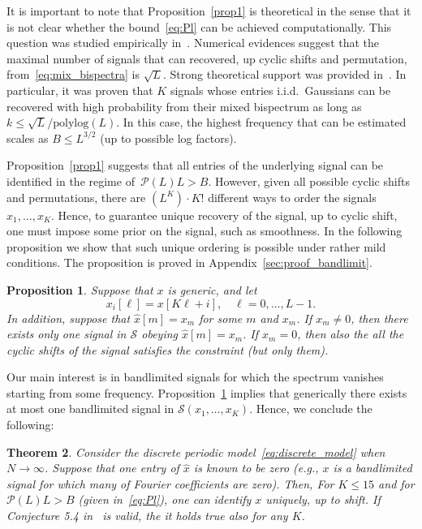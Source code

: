 \documentclass[english,12pt]{article}
\newcommand{\hx}{\hat{x}}
\newcommand{\TODO}[1]{{\color{red}{[#1]}}}
\newtheorem{thm}{Theorem}
\numberwithin{equation}{section}
\numberwithin{thm}{section} %
\newtheorem{prop}[thm]{Proposition}
\begin{document}
It is important to note that Proposition~\eqref{prop1} is theoretical in the sense that it is not clear whether the bound~\eqref{eq:Pl} can be achieved computationally.  
This question was studied empirically in~\cite{boumal2018heterogeneous}. Numerical evidences suggest that the maximal number of signals that can recovered, up cyclic shifts and permutation, from~\eqref{eq:mix_bispectra} is $\sqrt{L}$. 
Strong theoretical support was provided in~\cite{weinthesis}. In particular,  it was proven that $K$ signals whose entries i.i.d.\ Gaussians can be recovered with high probability from their mixed bispectrum as long as $k\leq \sqrt{L}/\text{polylog}(L)$.
In this case, the highest frequency that can be estimated scales as $B\leq L^{3/2}$ (up to possible log factors). 



Proposition~\ref{prop1} suggests that all entries of the underlying signal can be identified in the regime of~$\mathcal{P}(L)L>B$. However, given all possible cyclic shifts and permutations, there are $(L^K)\cdot K!$ \TODO{check this number}  different ways to order the signals $x_1,\ldots,x_K$. Hence, to guarantee unique recovery of the signal, up to cyclic shift, one must impose some prior on the signal, such as smoothness. In the following proposition we show that such unique ordering is possible under rather mild conditions.
The proposition is proved  in Appendix~\ref{sec:proof_bandlimit}.
\begin{prop} \label{prop:bandlimit}
Suppose that $x$ is generic, and let 
\begin{equation} \label{eq:sub_signals}
x_i[\ell] = x[K\ell + i], \quad \ell=0,\ldots,L-1.
\end{equation}
In addition, suppose that $\hx[m]=x_m$ for some $m$ and $x_m$.
If $x_m\neq 0$, then there exists only one signal in $\mathcal{S}$ obeying $\hx[m]=x_m$. If $x_m=0$, then also the all the cyclic shifts of the signal satisfies the constraint (but only them). 
\end{prop}	

Our main interest is in bandlimited signals for which the spectrum vanishes starting from some frequency. Proposition~\ref{prop:bandlimit} implies that generically there exists at most one bandlimited signal in  $\mathcal{S}(x_1,\ldots,x_K)$.  
Hence, we conclude the following:
\begin{thm} \label{thm:discrete}
Consider the  discrete periodic model~\eqref{eq:discrete_model} when $N\to\infty$. Suppose that one entry of $\hx$ is known to be zero (e.g., $x$ is a bandlimited signal for which many of Fourier coefficients are zero). 
Then, For $K\leq 15$ and for $\mathcal{P}(L)L>B$ (given in~\eqref{eq:Pl}), one can identify $x$ uniquely, up to shift. 
If Conjecture 5.4 in~\cite{bandeira2017estimation} is valid, the it holds true also for any $K$.
\end{thm}
\end{document}
